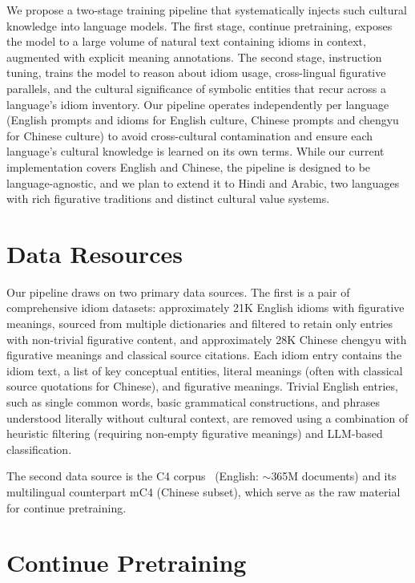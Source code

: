 \documentclass[11pt,a4paper]{article}
\begin{document}
We propose a two-stage training pipeline that systematically injects such cultural knowledge into language models. The first stage, continue pretraining, exposes the model to a large volume of natural text containing idioms in context, augmented with explicit meaning annotations. The second stage, instruction tuning, trains the model to reason about idiom usage, cross-lingual figurative parallels, and the cultural significance of symbolic entities that recur across a language's idiom inventory. Our pipeline operates independently per language (English prompts and idioms for English culture, Chinese prompts and chengyu for Chinese culture) to avoid cross-cultural contamination and ensure each language's cultural knowledge is learned on its own terms. While our current implementation covers English and Chinese, the pipeline is designed to be language-agnostic, and we plan to extend it to Hindi and Arabic, two languages with rich figurative traditions and distinct cultural value systems.

\section{Data Resources}

Our pipeline draws on two primary data sources. The first is a pair of comprehensive idiom datasets: approximately 21K English idioms with figurative meanings, sourced from multiple dictionaries and filtered to retain only entries with non-trivial figurative content, and approximately 28K Chinese chengyu with figurative meanings and classical source citations. Each idiom entry contains the idiom text, a list of key conceptual entities, literal meanings (often with classical source quotations for Chinese), and figurative meanings. Trivial English entries, such as single common words, basic grammatical constructions, and phrases understood literally without cultural context, are removed using a combination of heuristic filtering (requiring non-empty figurative meanings) and LLM-based classification.

The second data source is the C4 corpus~\citep{raffel2020exploring} (English: $\sim$365M documents) and its multilingual counterpart mC4 (Chinese subset), which serve as the raw material for continue pretraining.

\section{Continue Pretraining}
\end{document}
